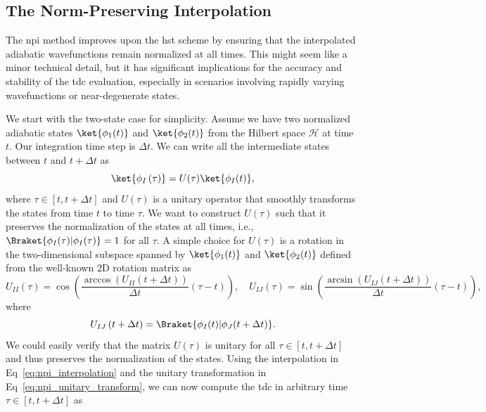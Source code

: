 \subsection{The Norm-Preserving Interpolation}\label{sec:norm_preserving_interpolation}
The \acrshort{npi} method improves upon the \acrshort{hst} scheme by ensuring that the interpolated adiabatic wavefunctions remain normalized at all times.\supercite{10.1021/jz5009449,10.1021/acs.jctc.6b00673} This might seem like a minor technical detail, but it has significant implications for the accuracy and stability of the \acrshort{tdc} evaluation, especially in scenarios involving rapidly varying wavefunctions or near-degenerate states.

We start with the two-state case for simplicity. Assume we have two normalized adiabatic states $\ket{\phi_1(t)}$ and $\ket{\phi_2(t)}$ from the Hilbert space $\mathcal{H}$ at time $t$. Our integration time step is $\Delta t$. We can write all the intermediate states between $t$ and $t+\Delta t$ as
\begin{equation}\label{eq:npi_interpolation}
\ket{\phi_I\left(\tau\right)}=U(\tau)\ket{\phi_I(t)},
\end{equation}
where $\tau\in[t,t+\Delta t]$ and $U(\tau)$ is a unitary operator that smoothly transforms the states from time $t$ to time $\tau$. We want to construct $U(\tau)$ such that it preserves the normalization of the states at all times, i.e., $\Braket{\phi_I(\tau)\vert\phi_I(\tau)}=1$ for all $\tau$. A simple choice for $U(\tau)$ is a rotation in the two-dimensional subspace spanned by $\ket{\phi_1(t)}$ and $\ket{\phi_2(t)}$ defined from the well-known 2D rotation matrix as
\begin{equation}\label{eq:npi_unitary_transform}
U_{II}(\tau)=\cos\left(\frac{\arccos\left(U_{II}\left(t+\Delta t\right)\right)}{\Delta t}\left(\tau-t\right)\right),\quad U_{IJ}(\tau)=\sin\left(\frac{\arcsin\left(U_{IJ}\left(t+\Delta t\right)\right)}{\Delta t}\left(\tau-t\right)\right),
\end{equation}
where
\begin{equation}\label{eq:npi_unitary_matrix}
U_{IJ}\left(t+\Delta t\right)=\Braket{\phi_I(t)\vert\phi_J(t+\Delta t)}.
\end{equation}
We could easily verify that the matrix $U(\tau)$ is unitary for all $\tau\in[t,t+\Delta t]$ and thus preserves the normalization of the states.
Using the interpolation in Eq~\eqref{eq:npi_interpolation} and the unitary transformation in Eq~\eqref{eq:npi_unitary_transform}, we can now compute the \acrshort{tdc} in arbitrary time $\tau\in[t,t+\Delta t]$ as
